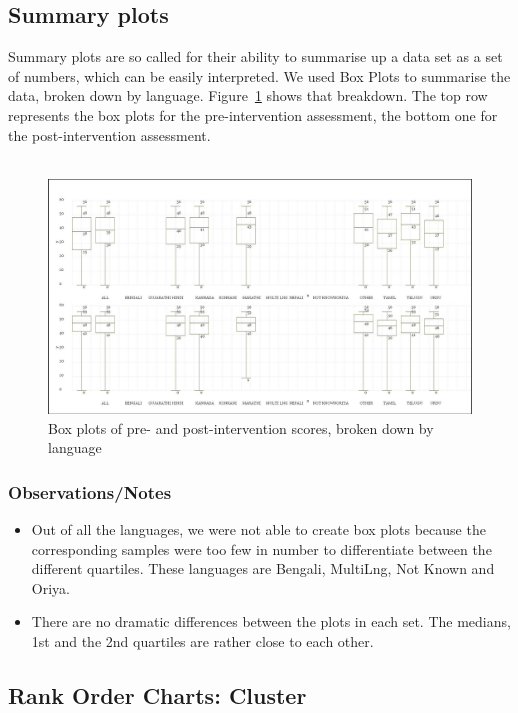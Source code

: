 \documentclass[10pt]{article}
\begin{document}
\newpage
\subsection{Summary plots}
Summary plots are so called for their ability to summarise up a data set as a set of numbers, which can be easily interpreted. We used Box Plots to summarise the data, broken down by language. Figure~\ref{BoxPlotPrePost} shows that breakdown. The top row represents the box plots for the pre-intervention assessment, the bottom one for the post-intervention assessment.\\\\
\begin{figure}
\caption{Box plots of pre- and post-intervention scores, broken down by language}
\label{BoxPlotPrePost}
\begin{center}
\includegraphics[width=160mm]{ReportMedia/BoxPlotPrePost.jpg}
\end{center}
\end{figure}
\subsubsection{Observations/Notes}
\begin{itemize}
\item Out of all the languages, we were not able to create box plots because the corresponding samples were too few in number to differentiate between the different quartiles. These languages are Bengali, MultiLng, Not Known and Oriya.
\item There are no dramatic differences between the plots in each set. The medians, 1st and the 2nd quartiles are rather close to each other.
\end{itemize}

\newpage
\subsection{Rank Order Charts: Cluster}
\end{document}
